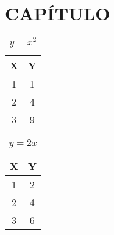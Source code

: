 %	
%	
%	
%
\section{CAPÍTULO}

\lipsum

\begin{table}
	\centering
	\begin{tabular}{|c|c|}
		\hline
		X & Y \\
		\hline
		1 & 1 \\
		\hline
		2 & 4 \\
		\hline
		3 & 9 \\
		\hline
	\end{tabular}
	\caption{$y = x^2$}
\end{table}

\begin{table}
	\centering
	\begin{tabular}{|c|c|}
		\hline
		X & Y \\
		\hline
		1 & 2 \\
		\hline
		2 & 4 \\
		\hline
		3 & 6 \\
		\hline
	\end{tabular}
	\caption{$y = 2x$}
\end{table}
